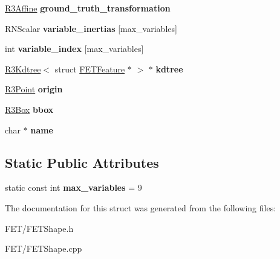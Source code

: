\begin{DoxyCompactItemize}
\item 
\hyperlink{class_r3_affine}{R3\+Affine} {\bfseries ground\+\_\+truth\+\_\+transformation}\hypertarget{struct_f_e_t_shape_a944991066ab04133d82798ca18ffbba9}{}\label{struct_f_e_t_shape_a944991066ab04133d82798ca18ffbba9}

\item 
R\+N\+Scalar {\bfseries variable\+\_\+inertias} \mbox{[}max\+\_\+variables\mbox{]}\hypertarget{struct_f_e_t_shape_a6c5247caf7aa4b61932f4a3c832c0bb7}{}\label{struct_f_e_t_shape_a6c5247caf7aa4b61932f4a3c832c0bb7}

\item 
int {\bfseries variable\+\_\+index} \mbox{[}max\+\_\+variables\mbox{]}\hypertarget{struct_f_e_t_shape_aac2e40699f1261b6687637c50d263350}{}\label{struct_f_e_t_shape_aac2e40699f1261b6687637c50d263350}

\item 
\hyperlink{class_r3_kdtree}{R3\+Kdtree}$<$ struct \hyperlink{struct_f_e_t_feature}{F\+E\+T\+Feature} $\ast$ $>$ $\ast$ {\bfseries kdtree}\hypertarget{struct_f_e_t_shape_a6deb5c492e57c6e96402f62310f3122d}{}\label{struct_f_e_t_shape_a6deb5c492e57c6e96402f62310f3122d}

\item 
\hyperlink{class_r3_point}{R3\+Point} {\bfseries origin}\hypertarget{struct_f_e_t_shape_af24adf2700337fe01eeefa2eb480f921}{}\label{struct_f_e_t_shape_af24adf2700337fe01eeefa2eb480f921}

\item 
\hyperlink{class_r3_box}{R3\+Box} {\bfseries bbox}\hypertarget{struct_f_e_t_shape_aea4ff3035cd6f934089b462e1e69c298}{}\label{struct_f_e_t_shape_aea4ff3035cd6f934089b462e1e69c298}

\item 
char $\ast$ {\bfseries name}\hypertarget{struct_f_e_t_shape_aea06bed838aeca2139e1eab3cf480f29}{}\label{struct_f_e_t_shape_aea06bed838aeca2139e1eab3cf480f29}

\end{DoxyCompactItemize}
\subsection*{Static Public Attributes}
\begin{DoxyCompactItemize}
\item 
static const int {\bfseries max\+\_\+variables} = 9\hypertarget{struct_f_e_t_shape_ad620e62c2f0a049c0451a695716902e3}{}\label{struct_f_e_t_shape_ad620e62c2f0a049c0451a695716902e3}

\end{DoxyCompactItemize}


The documentation for this struct was generated from the following files\+:\begin{DoxyCompactItemize}
\item 
F\+E\+T/F\+E\+T\+Shape.\+h\item 
F\+E\+T/F\+E\+T\+Shape.\+cpp\end{DoxyCompactItemize}

